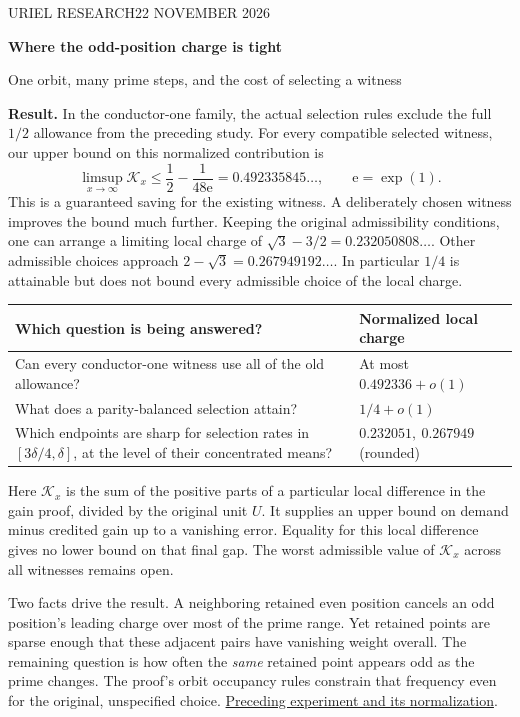 \documentclass[12pt,letterpaper]{article}
\begin{document}
\thispagestyle{plain}
{\sffamily\small\color{accent}URIEL RESEARCH\hfill 22 NOVEMBER 2026}\par\vspace{12pt}
{\Huge\bfseries\color{ink}Where the odd-position charge is tight\par}\vspace{5pt}
{\Large\color{muted}One orbit, many prime steps, and the cost of selecting a witness}\par\bigskip

\textbf{Result.} In the conductor-one family, the actual selection rules exclude the full \(1/2\) allowance from the preceding study. For every compatible selected witness, our upper bound on this normalized contribution is
\[
 \limsup_{x\to\infty}\mathcal K_x
 \le \frac12-\frac1{48\mathrm e}=0.492335845\ldots,\qquad \mathrm e=\exp(1).
\]
This is a guaranteed saving for the existing witness. A deliberately chosen witness improves the bound much further. Keeping the original admissibility conditions, one can arrange a limiting local charge of \(\sqrt3-3/2=0.232050808\ldots\). Other admissible choices approach \(2-\sqrt3=0.267949192\ldots\). In particular \(1/4\) is attainable but does not bound every admissible choice of the local charge.

\begin{center}\begin{tabularx}{\linewidth}{@{}Yl@{}}
\toprule
Which question is being answered? & Normalized local charge\\\midrule
Can every conductor-one witness use all of the old allowance? & At most \(0.492336+o(1)\)\\
What does a parity-balanced selection attain? & \(1/4+o(1)\)\\
Which endpoints are sharp for selection rates in \([3\delta/4,\delta]\), at the level of their concentrated means? & \(0.232051,\ 0.267949\) (rounded)\\\bottomrule
\end{tabularx}\end{center}
Here \(\mathcal K_x\) is the sum of the positive parts of a particular local difference in the gain proof, divided by the original unit \(U\). It supplies an upper bound on demand minus credited gain up to a vanishing error. Equality for this local difference gives no lower bound on that final gap. The worst admissible value of \(\mathcal K_x\) across all witnesses remains open.

Two facts drive the result. A neighboring retained even position cancels an odd position's leading charge over most of the prime range. Yet retained points are sparse enough that these adjacent pairs have vanishing weight overall. The remaining question is how often the \emph{same} retained point appears odd as the prime changes. The proof's orbit occupancy rules constrain that frequency even for the original, unspecified choice. \href{https://github.com/nousentllc/riemann-hypothesis/pull/9}{Preceding experiment and its normalization}.
\end{document}
